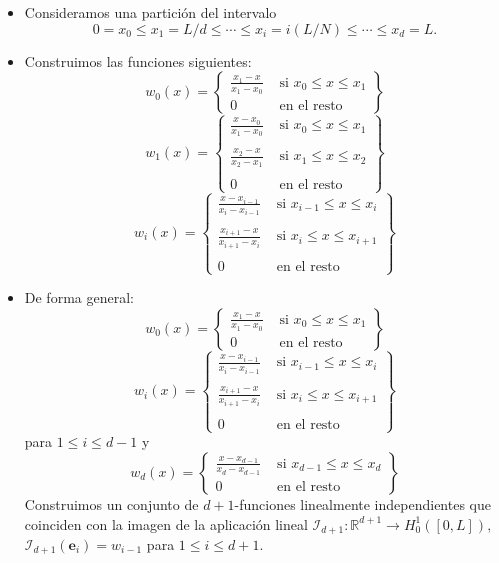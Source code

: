 \documentclass[10pt,handout]{beamer}
\theoremstyle{plain} %
\theoremstyle{plain} %
\theoremstyle{plain} %
\theoremstyle{plain} %
\theoremstyle{definition}
\theoremstyle{example}
\theoremstyle{example}
\theoremstyle{remark}
\theoremstyle{remark}
\begin{document}
\begin{frame}
\begin{itemize}
\item Consideramos una partición del intervalo 
$$
0 = x_0 \le x_1 = L/d \le \cdots \le x_i = i (L/N) \le \cdots \le x_d = L.
$$
\item Construimos las funciones siguientes:
$$
w_0(x)= \left\{
\begin{array}{cc}
\frac{x_1-x}{x_1-x_0} & \text{ si } x_0 \le x \le x_1 \\ 
0 & \text{ en el resto} 
\end{array}
\right\}
$$
$$
w_1(x)= \left\{
\begin{array}{cc}
\frac{x-x_0}{x_1-x_0} & \text{ si } x_0 \le x \le x_1 \\ 
& \\
\frac{x_2-x}{x_2-x_1} & \text{ si } x_1 \le x \le x_2 \\ 
& \\ 
0 & \text{ en el resto} 
\end{array}
\right\}
$$
$$
w_i(x)= \left\{
\begin{array}{cc}
\frac{x-x_{i-1}}{x_i-x_{i-1}} & \text{ si } x_{i-1} \le x \le x_i \\ 
& \\
\frac{x_{i+1}-x}{x_{i+1}-x_i} & \text{ si } x_{i} \le x \le x_{i+1} \\ 
& \\ 
0 & \text{ en el resto} 
\end{array}
\right\}
$$
\end{itemize}
\end{frame}

\begin{frame}
\begin{itemize}
\item De forma general:
$$
w_0(x)= \left\{
\begin{array}{cc}
\frac{x_1-x}{x_1-x_0} & \text{ si } x_0 \le x \le x_1 \\ 
0 & \text{ en el resto} 
\end{array}
\right\}
$$
$$
w_i(x)= \left\{
\begin{array}{cc}
\frac{x-x_{i-1}}{x_i-x_{i-1}} & \text{ si } x_{i-1} \le x \le x_i \\ 
& \\
\frac{x_{i+1}-x}{x_{i+1}-x_i} & \text{ si } x_{i} \le x \le x_{i+1} \\ 
& \\ 
0 & \text{ en el resto} 
\end{array}
\right\}
$$
para $1 \le i \le d-1$ y 
$$
w_d(x)= \left\{
\begin{array}{cc}
\frac{x-x_{d-1}}{x_d-x_{d-1}} & \text{ si } x_{d-1} \le x \le x_d \\ 
0 & \text{ en el resto} 
\end{array}
\right\}
$$
Construimos un conjunto de $d+1$-funciones linealmente independientes que coinciden con la imagen de la aplicación lineal
$\mathcal{I}_{d+1}:\mathbb{R}^{d+1} \longrightarrow H_0^1([0,L]),$ $\mathcal{I}_{d+1}(\mathbf{e}_i) = w_{i-1}$ para $1 \le i \le d+1.$
\end{itemize}
\end{frame}
\end{document}
